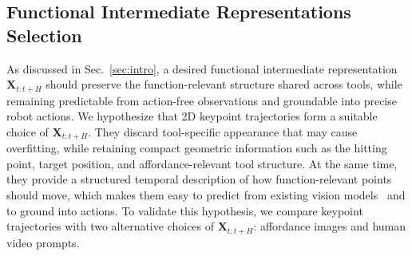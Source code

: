 




\subsection{Functional Intermediate Representations Selection}
\label{sec:Functional Intermediate Representations Selection}
As discussed in Sec.~\ref{sec:intro}, a desired functional intermediate representation $\mathbf{X}_{t:t+H}$ should preserve the function-relevant structure shared across tools, while remaining predictable from action-free observations and groundable into precise robot actions. 
We hypothesize that 2D keypoint trajectories form a suitable choice of $\mathbf{X}_{t:t+H}$. 
They discard tool-specific appearance that may cause overfitting, while retaining compact geometric information such as the hitting point, target position, and affordance-relevant tool structure. 
At the same time, they provide a structured temporal description of how function-relevant points should move, which makes them easy to predict from existing vision models~\cite{wen2023any} and to ground into actions. 
To validate this hypothesis, we compare keypoint trajectories with two alternative choices of $\mathbf{X}_{t:t+H}$: affordance images and human video prompts.

